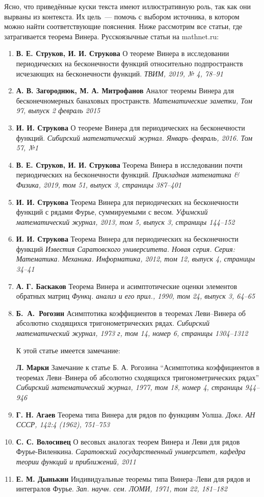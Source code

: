 \documentclass[12pt]{extarticle}
\theoremstyle{definition}
\begin{document}
  	 Ясно, что приведённые куски текста имеют иллюстративную роль, так как они вырваны из контекста. Их цель~--- помочь с выбором источника, в котором можно найти соответствующие пояснения. Ниже рассмотрим все статьи, где затрагивается теорема Винера. Русскоязычные статьи на mathnet.ru:
  	\begin{enumerate}
  		\item \textbf{В. Е. Струков, И. И. Струкова} О теореме Винера в исследовании периодических на бесконечности функций относительно подпространств исчезающих на бесконечности функций. \textit{ТВИМ, 2019, № 4, 78–91}
		\item \textbf{А. В. Загороднюк, М. А. Митрофанов} Аналог теоремы Винера для бесконечномерных банаховых пространств. \textit{Математические заметки, Том 97, выпуск 2 февраль 2015}
		\item \textbf{И. И. Струкова} О теореме Винера для периодических на бесконечности функций. \textit{Сибирский математический журнал. Январь--февраль, 2016. Том 57, №1}
		\item \textbf{В. Е. Струков, И. И. Струкова} Теорема Винера в исследовании почти периодических на бесконечности функций. \textit{Прикладная математика \& Физика, 2019, том 51, выпуск 3, страницы 387–401}
		\item \textbf{И. И. Струкова} Теорема Винера для периодических на бесконечности функций с рядами Фурье, суммируемыми с весом. \textit{Уфимский математический журнал, 2013, том 5, выпуск 3, страницы 144--152}
		\item \textbf{И. И. Струкова} Теорема Винера для периодических на бесконечности функций \textit{Известия Саратовского университета. Новая серия. Серия: Математика. Механика. Информатика, 2012, том 12, выпуск 4, страницы 34--41}
		\item \textbf{А. Г. Баскаков} Теорема Винера и асимптотические оценки элементов обратных матриц \textit{Функц. анализ и его прил., 1990, том 24, выпуск 3, 64–65}
		\item \textbf{Б.~А.~Рогозин} Асимптотика коэффициентов в теоремах Леви--Винера об абсолютно сходящихся тригонометрических рядах. \textit{Сибирский математический журнал, 1973 г, том 14, номер 6, страницы 1304--1312}
        \par К этой статье имеется замечание:
        \par\textbf{Л. Марки} Замечание к статье Б. А. Рогозина ``Асимптотика коэффициентов в теоремах Леви–Винера об абсолютно сходящихся тригонометрических рядах'' \textit{Сибирский математический журнал, 1977, том 18, номер 4, страницы 944–946}
		\item \textbf{Г. Н. Агаев} Теорема типа Винера для рядов по функциям Уолша. \textit{Докл. АН СССР, 142:4 (1962), 751–753}
		\item \textbf{С. С. Волосивец} О весовых аналогах теорем Винера и Леви для рядов Фурье-Ви\-лен\-ки\-на. \textit{Саратовский государственный университет, кафедра теории функций и приближений, 2011}
		\item \textbf{Е. М. Дынькин} Индивидуальные теоремы типа Винера–Леви для рядов и интегралов Фурье. \textit{Зап. научн. сем. ЛОМИ, 1971, том 22, 181–182}
  	\end{enumerate}
\end{document}
